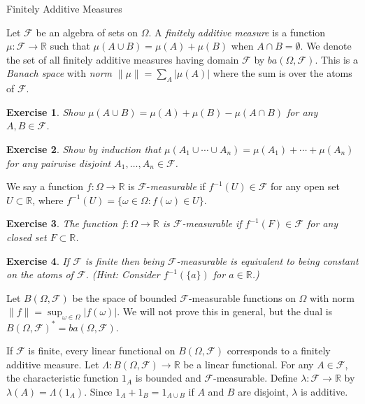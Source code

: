 \documentclass[fleqn]{amsart}
\newcommand{\R}{\mathbb{R}}
\newcommand{\F}{\mathcal{F}}
\newtheorem{exercise}{Exercise}
\begin{document}
\begin{section}{Finitely Additive Measures}

Let $\F$ be an algebra of sets on $\Omega$. A {\em finitely additive
measure} is a function $\mu\colon\F\to\R$ such that $\mu(A\cup B) =
\mu(A) + \mu(B)$ when $A\cap B=\emptyset$. We denote the set of
all finitely additive measures having domain $\F$ by $ba(\Omega, \F)$.
This is a {\em Banach space} with {\em norm} $\|\mu\|
= \sum_{A} |\mu(A)|$ where the sum is over the atoms of $\F$.

\begin{exercise}
Show $\mu(A\cup B) = \mu(A) + \mu(B) - \mu(A\cap B)$ for any $A,B\in\F$.
\end{exercise}

\begin{exercise}
Show by induction that $\mu(A_1\cup \cdots\cup A_n) = \mu(A_1) + \cdots
+ \mu(A_n)$ for any pairwise disjoint $A_1,\dots,A_n\in\F$.
\end{exercise}

We say a function $f\colon\Omega\to\R$ is
$\F$-{\em measurable} if $f^{-1}(U)\in\F$ for any open set $U\subset\R$,
where $f^{-1}(U) = \{\omega\in\Omega\colon f(\omega)\in U\}$.

\begin{exercise}
The function $f\colon\Omega\to\R$ is $\F$-measurable if
$f^{-1}(F)\in\F$ for any closed set $F\subset\R$.

\end{exercise}

\begin{exercise}
If $\F$ is finite then being $\F$-measurable is equivalent to
being constant on the atoms of $\F$. (Hint: Consider
$f^{-1}(\{a\})$ for $a\in\R$.)

\end{exercise}

Let $B(\Omega,\F)$ be the space of bounded $\F$-measurable
functions on $\Omega$ with norm $\|f\| = \sup_{\omega\in\Omega}
|f(\omega)|$. We will not prove this in general, but
the dual is $B(\Omega,\F)^*=ba(\Omega,\F)$.

If $\F$ is finite, every linear functional on $B(\Omega,\F)$ corresponds
to a finitely additive measure. Let $\Lambda\colon B(\Omega,\F)\to\R$
be a linear functional. For any $A\in\F$, the characteristic function
$1_A$ is bounded and $\F$-measurable. Define $\lambda\colon\F\to\R$
by $\lambda(A) = \Lambda(1_A)$. Since $1_A + 1_B = 1_{A\cup B}$ if
$A$ and $B$ are disjoint, $\lambda$ is additive. 


\end{section}
\end{document}
